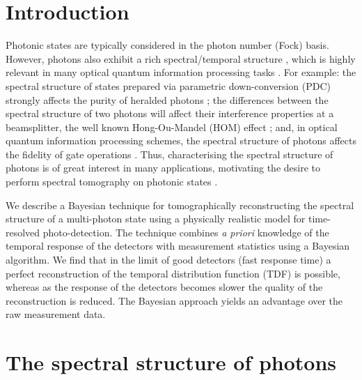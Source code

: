 \documentclass[aps,pra,twocolumn,amsmath,amssymb,color,superscriptaddress]{revtex4}
\begin{document}
\maketitle

%
%

\section{Introduction}

Photonic states are typically considered in the photon number (Fock) basis. However, photons also exhibit a rich spectral/temporal structure \cite{bib:RohdeMauererSilberhorn07}, which is highly relevant in many optical quantum information processing tasks \cite{bib:NielsenChuang00, bib:KokLovett11}. For example: the spectral structure of states prepared via parametric down-conversion (PDC) strongly affects the purity of heralded photons \cite{bib:Rubin94, bib:URen05}; the differences between the spectral structure of two photons will affect their interference properties at a beamsplitter, the well known Hong-Ou-Mandel (HOM) effect \cite{bib:HOM87}; and, in optical quantum information processing schemes, the spectral structure of photons affects the fidelity of gate operations \cite{bib:RohdeRalph05, bib:RohdeRalph05b, bib:RohdeRalph06, bib:RohdeRalphMunro06}. Thus, characterising the spectral structure of photons is of great interest in many applications, motivating the desire to perform spectral tomography on photonic states \cite{bib:Rohde06b}.

We describe a Bayesian technique for tomographically reconstructing the spectral structure of a multi-photon state using a physically realistic model for time-resolved photo-detection. The technique combines \emph{a priori} knowledge of the temporal response of the detectors with measurement statistics using a Bayesian algorithm. We find that in the limit of good detectors (fast response time) a perfect reconstruction of the temporal distribution function (TDF) is possible, whereas as the response of the detectors becomes slower the quality of the reconstruction is reduced. The Bayesian approach yields an advantage over the raw measurement data.

%
%

\section{The spectral structure of photons}
\end{document}
